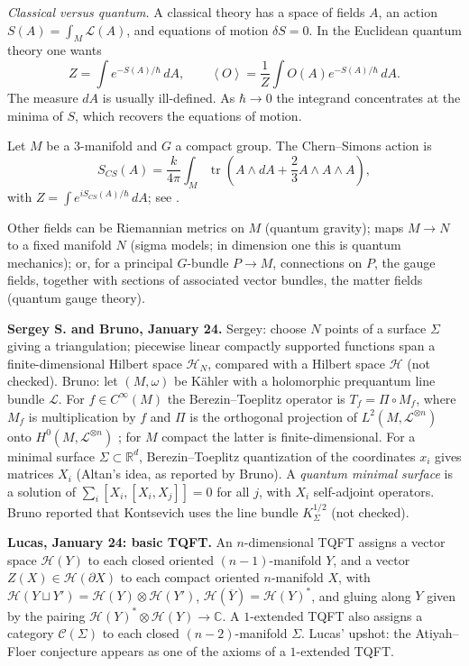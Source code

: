 {\it Classical versus quantum.} A classical
theory has a space of fields $A$, an action
$S(A)=\int_M\mathcal{L}(A)$, and equations
of motion $\delta S=0$. In the Euclidean
quantum theory one wants
$$
Z=\int e^{-S(A)/\hbar}\,dA,\qquad
\left\langle{} O \right\rangle{}
=\frac{1}{Z}\int O(A)
e^{-S(A)/\hbar}\,dA.
$$
The measure $dA$ is usually ill-defined. As
$\hbar\to 0$ the integrand concentrates at
the minima of $S$, which recovers the
equations of motion.

\begin{example}
\label{example-ym-chern-simons}
Let $M$ be a $3$-manifold and $G$ a compact
group. The Chern--Simons action is
$$
S_{CS}(A)=\frac{k}{4\pi}\int_M
\operatorname{tr}\left(A\wedge dA
+\frac{2}{3}A\wedge A\wedge A\right),
$$
with $Z=\int e^{iS_{CS}(A)/\hbar}\,dA$; see
\cite[(3.7)]{moore-chern-simons}.
\end{example}

Other fields can be Riemannian metrics on $M$
(quantum gravity); maps $M\to N$ to a fixed
manifold $N$ (sigma models; in dimension
one this is quantum mechanics); or, for a
principal $G$-bundle $P\to M$, connections
on $P$, the gauge fields, together with
sections of associated vector bundles, the
matter fields (quantum gauge theory).

\medskip\noindent
{\bf Sergey S. and Bruno, January 24.}
Sergey: choose $N$ points of a surface
$\Sigma$ giving a triangulation; piecewise
linear compactly supported functions span a
finite-dimensional Hilbert space
$\mathcal{H}_N$, compared with a Hilbert
space $\mathcal{H}$ (not checked). Bruno:
let $(M,\omega)$ be Kähler with a
holomorphic prequantum line bundle
$\mathcal{L}$. For $f\in C^\infty(M)$ the
Berezin--Toeplitz operator is
$T_f=\Pi\circ M_f$, where $M_f$ is
multiplication by $f$ and $\Pi$ is the
orthogonal projection of
$L^2(M,\mathcal{L}^{\otimes n})$ onto
$H^0(M,\mathcal{L}^{\otimes n})$
\cite[(3.5)]{schlichenmaier-bt}; for $M$
compact the latter is finite-dimensional.
For a minimal surface $\Sigma\subset
\mathbb{R}^d$, Berezin--Toeplitz
quantization of the coordinates $x_i$ gives
matrices $X_i$ (Altan's idea, as reported by
Bruno). A {\it quantum minimal
surface} \cite{kon} is a solution of
$\sum_i[X_i,[X_i,X_j]]=0$ for all $j$, with
$X_i$ self-adjoint operators. Bruno
reported that Kontsevich uses the line
bundle $K_\Sigma^{1/2}$ (not checked).

\medskip\noindent
{\bf Lucas, January 24: basic TQFT.} An
$n$-dimensional TQFT assigns a vector space
$\mathcal{H}(Y)$ to each closed oriented
$(n-1)$-manifold $Y$, and a vector
$Z(X)\in\mathcal{H}(\partial X)$ to each
compact oriented $n$-manifold $X$, with
$\mathcal{H}(Y\sqcup Y')=
\mathcal{H}(Y)\otimes\mathcal{H}(Y')$,
$\mathcal{H}(\overline{Y})=
\mathcal{H}(Y)^*$, and gluing along $Y$
given by the pairing
$\mathcal{H}(Y)^*\otimes\mathcal{H}(Y)\to
\mathbb{C}$. A $1$-extended TQFT also
assigns a category $\mathcal{C}(\Sigma)$ to
each closed $(n-2)$-manifold $\Sigma$.
Lucas' upshot: the Atiyah--Floer conjecture
appears as one of the axioms of a
$1$-extended TQFT.

